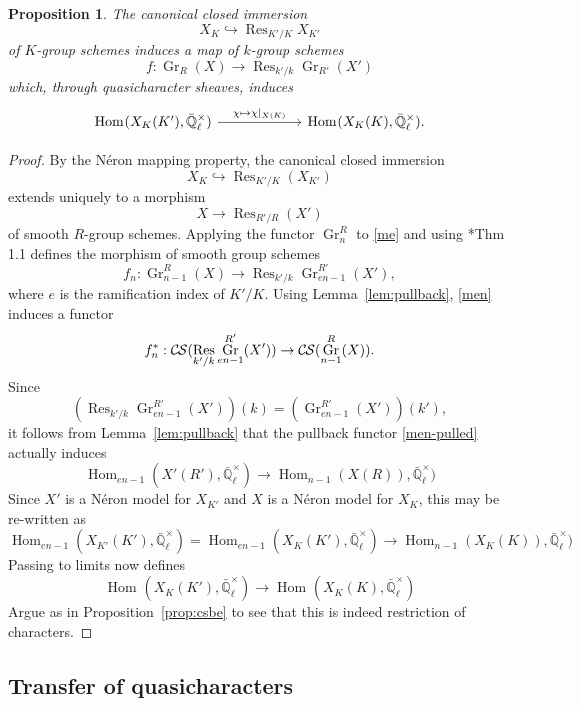 \documentclass[10pt]{amsart}
\theoremstyle{plain}
\newtheorem{proposition}[theorem]{Proposition}
\theoremstyle{definition}
\newcommand{\EE}{\mathbb{\bar Q}_\ell}
\newcommand{\Fq}{k}
\newcommand{\EEx}{\EE^\times}
\DeclareMathOperator{\Hom}{Hom}
\DeclareMathOperator{\Gr}{Gr}
\DeclareMathOperator{\Res}{Res}
\newcommand{\CS}{{\mathcal{C\hskip-0.8pt S}}}
\begin{document}
\begin{proposition}\label{prop:wrK}
The canonical closed immersion 
\[
X_K \hookrightarrow \Res_{K'/K} X_{K'}
\]
of $K$-group schemes
induces a map of $\Fq$-group schemes 
\[
f : \Gr_R(X) \to \Res_{k'/k} \Gr_{R'}(X')
\] 
which, through quasicharacter sheaves, induces
\[
\begin{tikzcd}[column sep=60]
\Hom_{\text{}}(X_K(K'), \EEx) \arrow{r}{\chi \mapsto \chi\vert_{X(K)}} &\Hom_{\text{}}(X_K(K), \EEx).
\end{tikzcd}
\]
\end{proposition}

\begin{proof}
By the N\'eron mapping property, the canonical closed immersion
\[
X_K\hookrightarrow \Res_{K'/K}(X_{K'})
\]
 extends uniquely to a morphism
\begin{equation}\label{me}
X\to \Res_{R'/R}(X')
\end{equation}
 of smooth $R$-group schemes.
%
Applying the functor $\Gr^R_{n}$ to \eqref{me}
and using \cite{bertapelle-gonzales:Greenberg}*{Thm 1.1} defines the morphism of smooth group schemes
\begin{equation}\label{men}
f_n: \Gr_{n-1}^R(X) \to \Res_{k'/k} \Gr_{en-1}^{R'}(X'),
\end{equation}
where $e$ is the ramification index of $K'/K$.
Using Lemma~\ref{lem:pullback}, \eqref{men} induces a functor 
\begin{equation}\label{men-pulled}
f_n^* : \CS(\Res_{k'/k} \Gr_{en-1}^{R'}(X'))\to \CS(\Gr_{n-1}^{R}(X)).
\end{equation}
Since 
\[
\left(\Res_{k'/k} \Gr_{en-1}^{R'}(X') \right)(\Fq) = \left(\Gr_{en-1}^{R'}(X')\right)(k'),
\]
it follows from Lemma~\ref{lem:pullback} that the pullback functor \eqref{men-pulled} actually induces
\[ 
\Hom_{en-1}(X'(R'),\EEx) \to \Hom_{n-1}(X(R)),\EEx)
\]
Since $X'$ is a N\'eron model for $X_{K'}$ and $X$ is a N\'eron model for $X_K$,
 this may be re-written as
 \[ 
\Hom_{en-1}(X_{K'}(K'),\EEx)= \Hom_{en-1}(X_{K}(K'),\EEx) \to \Hom_{n-1}(X_K(K)),\EEx)
\]
Passing to limits now defines
\[ 
\Hom_\text{}(X_K(K'),\EEx) \to \Hom_\text{}(X_K(K),\EEx)
\]
Argue as in Proposition~\ref{prop:csbe} to see that this is indeed restriction of characters.
\end{proof}

\subsection{Transfer of quasicharacters}\label{ssec:transfer}
\end{document}
